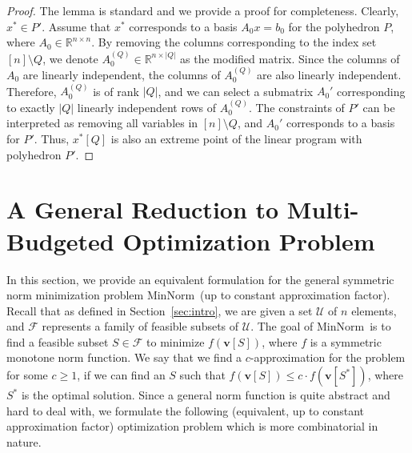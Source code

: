 \documentclass[11pt,a4paper]{article} \usepackage{enumitem}
\newcommand{\assigned}[1]{[ #1 ]}
\newcommand{\calF}{\mathcal{F}}
\newcommand{\calU}{\mathcal{U}}
\newcommand{\boldv}{\boldsymbol{v}}
\newcommand{\minnorm}{\textsf{MinNorm}}
\theoremstyle{definition}
\begin{document}
\begin{proof}
The lemma is standard and we provide a proof for completeness.
Clearly, $x^* \in P'$. 
Assume that $x^*$ corresponds to a basis $A_0x = b_0$ for the polyhedron $P$, where $A_0 \in \mathbb{R}^{n \times n}$. 
By removing the columns corresponding to the index set $[n] \setminus Q$, we denote $A_0^{(Q)} \in \mathbb{R}^{n \times |Q|}$ as the modified matrix.
Since the columns of $A_0$ are linearly independent, the columns of $A_0^{(Q)}$ are also linearly independent. Therefore, $A_0^{(Q)}$ is of rank $|Q|$, and we can select a submatrix $A_0'$ corresponding to exactly $|Q|$ linearly independent rows of $A_0^{(Q)}$.
The constraints of $P'$ can be interpreted as removing all variables in $[n] \setminus Q$, and $A_0'$ corresponds to a basis for $P'$. 
Thus, $x^*\assigned{Q}$ is also an extreme point of the linear program with polyhedron $P'$.
\end{proof}









 



\section{A General Reduction to Multi-Budgeted Optimization Problem}
\label{sec:reduction}

In this section, we provide an equivalent formulation for the general symmetric norm minimization problem \minnorm\ (up to constant approximation factor). Recall that as defined in Section~\ref{sec:intro}, 
we are given a set $\calU$ of $n$ elements, and 
$\calF$ represents a family of feasible subsets of $\calU$.
The goal of \minnorm\ is to find a feasible subset $S\in\calF$ to minimize $f(\boldv[S])$,
where $f$ is a symmetric monotone norm function. 
We say that we find a $c$-approximation for the problem for some $c\geq 1$,
if we can find an $S$ such that $f(\boldv[S])\leq c\cdot f(\boldv[S^*])$, where $S^*$ is the optimal solution. 
Since a general norm function is quite abstract and hard to deal with,
we formulate the following (equivalent, up to constant approximation factor) optimization problem which is more combinatorial in nature. 
\end{document}
